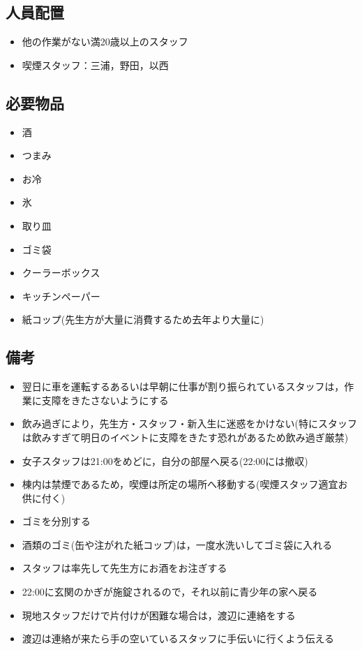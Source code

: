 \subsection{人員配置}
\begin{itemize}
\item 他の作業がない満20歳以上のスタッフ
\item 喫煙スタッフ：三浦，野田，以西
\end{itemize}


\subsection{必要物品}
\begin{itemize}
  \item 酒
  \item つまみ
  \item お冷
  \item 氷
  \item 取り皿
  \item ゴミ袋
  \item クーラーボックス
  \item キッチンペーパー
  \item 紙コップ(先生方が大量に消費するため去年より大量に)
\end{itemize}


\subsection{備考}
\begin{itemize}
	\item 翌日に車を運転するあるいは早朝に仕事が割り振られているスタッフは，作業に支障をきたさないようにする
	\item 飲み過ぎにより，先生方・スタッフ・新入生に迷惑をかけない(特にスタッフは飲みすぎて明日のイベントに支障をきたす恐れがあるため飲み過ぎ厳禁)
	\item 女子スタッフは21:00をめどに，自分の部屋へ戻る(22:00には撤収)
	\item 棟内は禁煙であるため，喫煙は所定の場所へ移動する(喫煙スタッフ適宜お供に付く)
	\item ゴミを分別する
	\item 酒類のゴミ(缶や注がれた紙コップ)は，一度水洗いしてゴミ袋に入れる
	\item スタッフは率先して先生方にお酒をお注ぎする
	\item 22:00に玄関のかぎが施錠されるので，それ以前に青少年の家へ戻る
	\item 現地スタッフだけで片付けが困難な場合は，渡辺に連絡をする
	\item 渡辺は連絡が来たら手の空いているスタッフに手伝いに行くよう伝える
\end{itemize}

%
